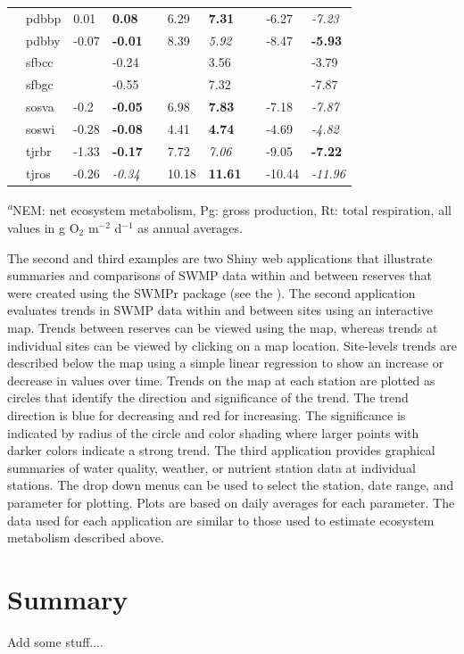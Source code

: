 \documentclass[10pt,letterpaper]{article}\usepackage[]{graphicx}\usepackage[]{color}
\begin{document}
\begin{table}[!tbp]
{\begin{center}
\begin{tabular}{lllcllcll}
~~pdbbp&0.01&{\bf 0.08}&&6.29&{\bf 7.31}&&-6.27&{\it -7.23}\tabularnewline
~~pdbby&-0.07&{\bf -0.01}&&8.39&{\it 5.92}&&-8.47&{\bf -5.93}\tabularnewline
~~sfbcc&&-0.24&&&3.56&&&-3.79\tabularnewline
~~sfbgc&&-0.55&&&7.32&&&-7.87\tabularnewline
~~sosva&-0.2&{\bf -0.05}&&6.98&{\bf 7.83}&&-7.18&{\it -7.87}\tabularnewline
~~soswi&-0.28&{\bf -0.08}&&4.41&{\bf 4.74}&&-4.69&{\it -4.82}\tabularnewline
~~tjrbr&-1.33&{\bf -0.17}&&7.72&{\it 7.06}&&-9.05&{\bf -7.22}\tabularnewline
~~tjros&-0.26&{\it -0.34}&&10.18&{\bf 11.61}&&-10.44&{\it -11.96}\tabularnewline
\hline
\end{tabular}\end{center}}

\footnotesize{\textsuperscript{{\it a}}NEM: net ecosystem metabolism, Pg: gross production, Rt: total respiration, all values in g O$_2$ m$^{-2}$ d$^{-1}$ as annual averages.}\end{table}


The second and third examples are two Shiny web applications \cite{Chang15} that illustrate summaries and comparisons of \ac{SWMP} data within and between reserves that were created using the SWMPr package (see the ).  The second application evaluates trends in \ac{SWMP} data within and between sites using an interactive map.  Trends between reserves can be viewed using the map, whereas trends at individual sites can be viewed by clicking on a map location.  Site-levels trends are described below the map using a simple linear regression to show an increase or decrease in values over time.  Trends on the map at each station are plotted as circles that identify the direction and significance of the trend.  The trend direction is blue for decreasing and red for increasing.  The significance is indicated by radius of the circle and color shading where larger points with darker colors indicate a strong trend.  The third application provides graphical summaries of water quality, weather, or nutrient station data at individual stations. The drop down menus can be used to select the station, date range, and parameter for plotting. Plots are based on daily averages for each parameter.  The data used for each application are similar to those used to estimate ecosystem metabolism described above.  

\section*{Summary}

Add some stuff....
\end{document}
